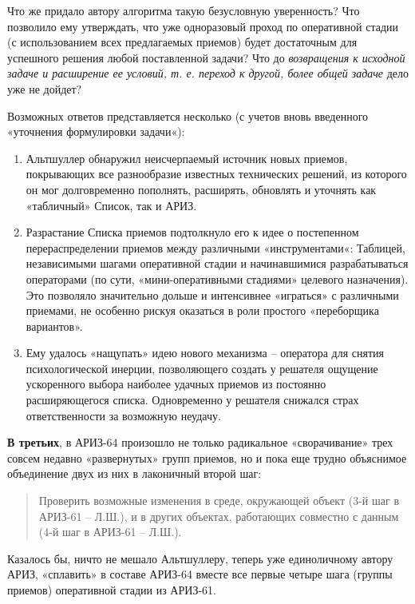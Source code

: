 \documentclass[11pt,a4paper]{article}
\begin{document}
Что же придало автору алгоритма такую безусловную уверенность? Что позволило
ему утверждать, что уже одноразовый проход по оперативной стадии (с
использованием всех предлагаемых приемов) будет достаточным для успешного
решения любой поставленной задачи? Что до \emph{возвращения к исходной задаче
  и расширение ее условий, т. е. переход к другой, более общей задаче} дело
уже не дойдет?

Возможных ответов представляется несколько (с учетов вновь введенного
«уточнения формулировки задачи«):
\begin{enumerate}
\item Альтшуллер обнаружил неисчерпаемый источник новых приемов, покрывающих
  все разнообразие известных технических решений, из которого он мог
  долговременно пополнять, расширять, обновлять и уточнять как «табличный»
  Список, так и АРИЗ.
\item Разрастание Списка приемов подтолкнуло его к идее о постепенном
  перераспределении приемов между различными «инструментами«: Таблицей,
  независимыми шагами оперативной стадии и начинавшимися разрабатываться
  операторами (по сути, «мини-оперативными стадиями» целевого назначения). Это
  позволяло значительно дольше и интенсивнее «играться» с различными приемами,
  не особенно рискуя оказаться в роли простого «переборщика вариантов».
\item Ему удалось «нащупать» идею нового механизма -- оператора для снятия
  психологической инерции, позволяющего создать у решателя ощущение
  ускоренного выбора наиболее удачных приемов из постоянно расширяющегося
  списка. Одновременно у решателя снижался страх ответственности за возможную
  неудачу.
\end{enumerate}

\textbf{В третьих}, в АРИЗ-64 произошло не только радикальное «сворачивание»
трех совсем недавно «развернутых» групп приемов, но и пока еще трудно
объяснимое объединение двух из них в лаконичный второй шаг:
\begin{quote}
  Проверить возможные изменения в среде, окружающей объект (3-й шаг в АРИЗ-61
  -- Л.Ш.), и в других объектах, работающих совместно с данным (4-й шаг в
  АРИЗ-61 -- Л.Ш.).
\end{quote}
Казалось бы, ничто не мешало Альтшуллеру, теперь уже единоличному автору АРИЗ,
«сплавить» в составе АРИЗ-64 вместе все первые четыре шага (группы приемов)
оперативной стадии из АРИЗ-61.
\end{document}
